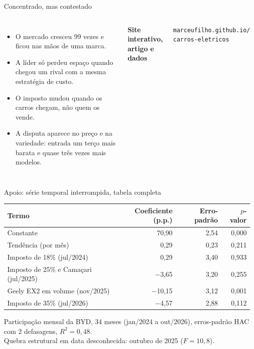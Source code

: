 \documentclass[aspectratio=169,11pt]{beamer}
\begin{document}
\begin{frame}{Concentrado, mas contestado}
\begin{columns}[c]
\begin{itemize}
\item O mercado cresceu 99 vezes e ficou nas mãos de uma marca.
\item A líder só perdeu espaço quando chegou um rival com a mesma estratégia de custo.
\item O imposto mudou quando os carros chegam, não quem os vende.
\item A disputa aparece no preço e na variedade: entrada um terço mais barata e quase três vezes mais modelos.
\end{itemize}
\textbf{Site interativo, artigo e dados}\par\vspace{6pt}
{\small\texttt{marceufilho.github.io/\\carros-eletricos}}
\end{columns}
\end{frame}

\appendix

\begin{frame}{Apoio: série temporal interrompida, tabela completa}
\small
\centering
\begin{tabular}{lrrr}
\toprule
Termo & Coeficiente (p.p.) & Erro-padrão & $p$-valor \\
\midrule
Constante & 70,90 & 2,54 & 0,000 \\
Tendência (por mês) & 0,29 & 0,23 & 0,211 \\
Imposto de 18\% (jul/2024) & 0,29 & 3,40 & 0,933 \\
Imposto de 25\% e Camaçari (jul/2025) & $-$3,65 & 3,20 & 0,255 \\
Geely EX2 em volume (nov/2025) & $-$10,15 & 3,12 & 0,001 \\
Imposto de 35\% (jul/2026) & $-$4,57 & 2,88 & 0,112 \\
\bottomrule
\end{tabular}
\par\vspace{8pt}
{\footnotesize\color{cinza}Participação mensal da BYD, 34 meses (jan/2024 a out/2026), erros-padrão HAC com 2 defasagens, $R^2 = 0{,}48$.\\
Quebra estrutural em data desconhecida: outubro de 2025 ($F = 10{,}8$).}
\end{frame}
\end{document}
